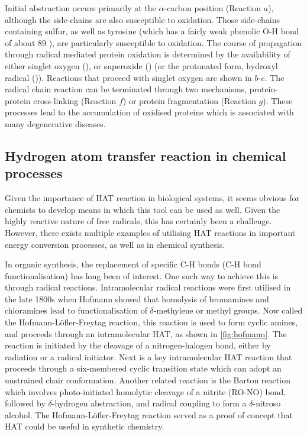 Initial abstraction occurs primarily at the $\alpha$-carbon position (Reaction
$a$), although the side-chains are also susceptible to oxidation.  Those
side-chains containing sulfur,\cite{Stadtman2004} as well as tyrosine (which has
a fairly weak phenolic O-H bond of about 89 \kcalmol),\cite{Mulder2005} are
particularly susceptible to oxidation. The course of propagation through radical
mediated protein oxidation is determined by the availability of either singlet
oxygen (), or superoxide () (or the protonated form,
hydroxyl radical ()). Reactions that proceed with singlet oxygen are
shown in $b$-$e$. The radical chain reaction can be terminated through two
mechanisms, protein-protein cross-linking (Reaction $f$) or protein
fragmentation (Reaction $g$). These processes lead to the accumulation of
oxidised proteins which is associated with many degenerative
diseases.\cite{Halliwell2006}


\subsection{Hydrogen atom transfer reaction in chemical processes}

Given the importance of HAT reaction in biological systems, it seems obvious for
chemists to develop means in which this tool can be used as well. Given the
highly reactive nature of free radicals, this has certainly been a challenge.
However, there exists multiple examples of utilising HAT reactions in important
energy conversion processes,\cite{Hammes-Schiffer2012} as well as in chemical
synthesis.\cite{Balcells2016,Miller2016}

In organic synthesis, the replacement of specific C-H bonds (C-H bond
functionalisation) has long been of interest. One such way to achieve this is
through radical reactions.\cite{Godula2006} Intramolecular radical reactions
were first utilised in the late 1800s when Hofmann showed that homolysis of
bromamines and chloramines lead to functionalisation of $\delta$-methylene or
methyl groups. Now called the
Hofmann-L{\"o}fler-Freytag reaction, this reaction is used to form cyclic
amines, and proceeds through an intramolecular HAT, as shown in
\ref{fig:hofmann}. The reaction is initiated by the cleavage of a
nitrogen-halogen bond, either by radiation or a radical initiator. Next is a key
intramolecular HAT reaction that proceeds through a six-membered cyclic
transition state which can adopt an unstrained chair conformation.  Another
related reaction is the Barton reaction\cite{Barton1960} which involves
photo-initiated homolytic cleavage of a nitrite (RO-NO) bond, followed by
$\delta$-hydrogen abstraction, and radical coupling to form a $\delta$-nitroso
alcohol. The Hofmann-L{\"o}fler-Freytag reaction served as a proof of concept
that HAT could be useful in synthetic chemistry.

